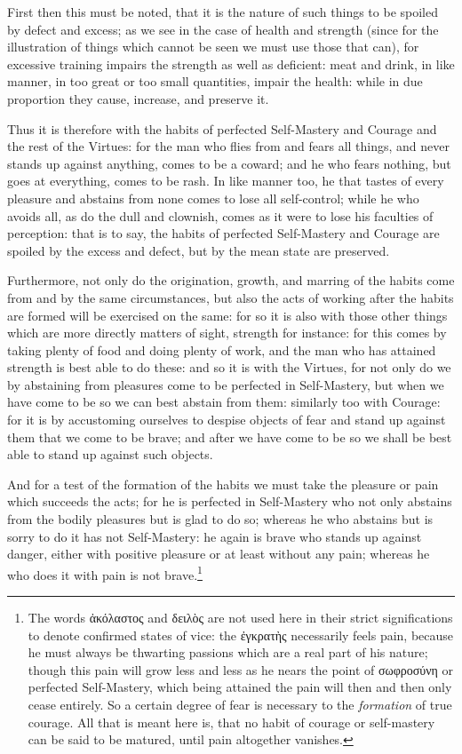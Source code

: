 First then this must be noted, that it is the nature of such things to be
spoiled by defect and excess; as we see in the case of health and strength
(since for the illustration of things which cannot be seen we must use those
that can), for excessive training impairs the strength as well as deficient:
meat and drink, in like manner, in too great or too small quantities, impair
the health: while in due proportion they cause, increase, and preserve it.

Thus it is therefore with the habits of perfected Self-Mastery and Courage and
the rest of the Virtues: for the man who flies from and fears all things, and
never stands up against anything, comes to be a coward; and he who fears
nothing, but goes at everything, comes to be rash. In like manner too, he that
tastes of every pleasure and abstains from none comes to lose all self-control;
while he who avoids all, as do the dull and clownish, comes as it were to lose
his faculties of perception: that is to say, the habits of perfected
Self-Mastery and Courage are spoiled by the excess and defect, but by the mean
state are preserved.

Furthermore, not only do the origination, growth, and marring of the habits
come from and by the same circumstances, but also the acts of working after the
habits are formed will be exercised on the same: for so it is also with those
other things which are more directly matters of sight, strength for instance:
for this comes by taking plenty of food and doing plenty of work, and the man
who has attained strength is best able to do these: and so it is with the
Virtues, for not only do we by abstaining from pleasures come to be perfected
in Self-Mastery, but when we have come to be so we can best abstain from them:
similarly too with Courage: for it is by accustoming ourselves to despise
objects of fear and stand up against them that we come to be brave; and after
we have come to be so we shall be best able to stand up against such objects.

And for a test of the formation of the habits we must take the pleasure or pain
which succeeds the acts; for he is perfected in Self-Mastery who not only
abstains from the bodily pleasures but is glad to do so; whereas he who
abstains but is sorry to do it has not Self-Mastery: he again is brave who
stands up against danger, either with positive pleasure or at least without any
pain; whereas he who does it with pain is not brave.\footnote{The words ἀκόλαστος and
δειλὸς are not used here in their strict
significations to denote confirmed states of vice: the
ἐγκρατὴς necessarily feels pain,
because he must always be thwarting passions which are a real part of his
nature; though this pain will grow less and less as he nears the point of
σωφροσύνη or perfected
Self-Mastery, which being attained the pain will then and then only cease
entirely. So a certain degree of fear is necessary to the \emph{formation} of
true courage. All that is meant here is, that no habit of courage or
self-mastery can be said to be matured, until pain altogether vanishes.}

